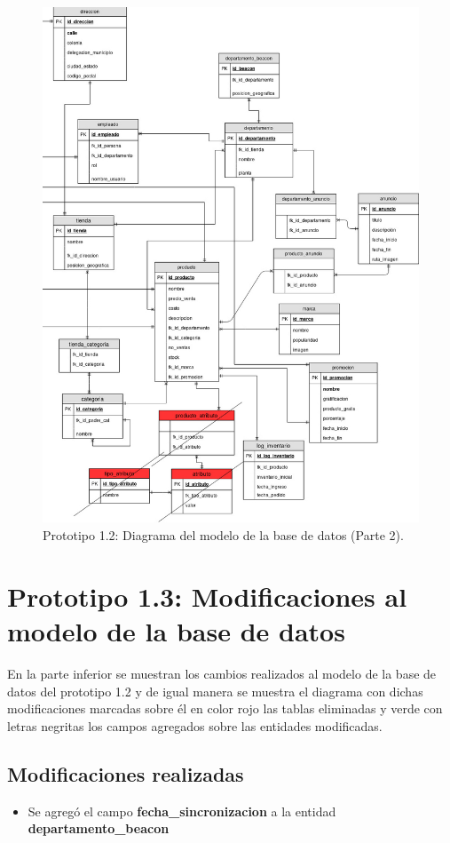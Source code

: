 \FloatBarrier
\begin{figure}[htbp!]
		\centering
			\includegraphics[width=.85 \textwidth]{imagenes/modeloDatos/prototipo12/TT_Database_11_2}
		\caption{Prototipo 1.2: Diagrama del modelo de la base de datos (Parte 2).}
		\label{image:prototipo12basededatos3}
\end{figure}
\FloatBarrier



\section{Prototipo 1.3: Modificaciones al modelo de la base de datos}
En la parte inferior se muestran los cambios realizados al modelo de la base de datos del prototipo 1.2 y de igual manera se muestra el diagrama con dichas modificaciones marcadas sobre él en color rojo las tablas eliminadas y verde con letras negritas los campos agregados sobre las entidades modificadas.

\subsection{Modificaciones realizadas}
\begin{itemize}
\item Se agregó el campo \textbf{fecha\_sincronizacion} a la entidad \textbf{departamento\_beacon}
\end{itemize}
